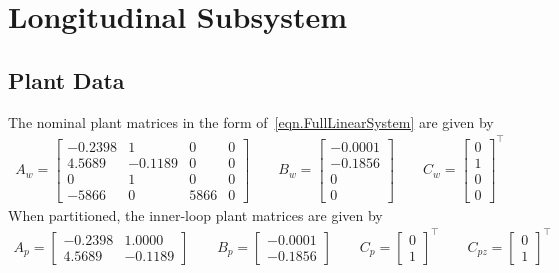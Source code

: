 \section{Longitudinal Subsystem}\label{sec.appendix_long}

\subsection{Plant Data}
The nominal plant matrices in the form of\ \eqref{eqn.FullLinearSystem} are given by
\begin{equation*}
  \begin{gathered}
    A_{w}=
    \begin{bmatrix}
      -0.2398 & 1 & 0 & 0 \\
      4.5689 & -0.1189 & 0 & 0 \\
      0 & 1 & 0 & 0 \\
      -5866 & 0 & 5866 & 0
    \end{bmatrix}
    \qquad
    B_{w}=
    \begin{bmatrix}
      -0.0001 \\
      -0.1856 \\
      0 \\
      0
    \end{bmatrix}
    \qquad
    C_{w} =
    \begin{bmatrix}
      0 \\
      1 \\
      0 \\
      0
    \end{bmatrix}^{\top}
  \end{gathered}
\end{equation*}
When partitioned, the inner-loop plant matrices are given by
\begin{equation*}
  \begin{gathered}
    A_{p}=
    \begin{bmatrix}
      -0.2398 & 1.0000 \\
      4.5689 & -0.1189
    \end{bmatrix}
    \qquad
    B_{p}=
    \begin{bmatrix}
      -0.0001 \\
      -0.1856
    \end{bmatrix}
    \qquad
    C_{p}=
    \begin{bmatrix}
      0 \\
      1
    \end{bmatrix}^{\top}
    \qquad
    C_{pz}=
    \begin{bmatrix}
      0 \\
      1
    \end{bmatrix}^{\top}
  \end{gathered}
\end{equation*}
